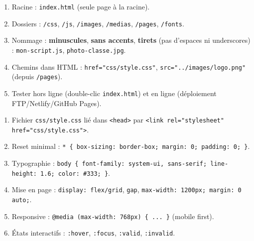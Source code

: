 \documentclass[11pt]{article}
\begin{document}
\begin{bilan}
\begin{methode}
\begin{enumerate}
    \item Racine : \texttt{index.html} (seule page à la racine).
    \item Dossiers : \texttt{/css}, \texttt{/js}, \texttt{/images}, \texttt{/medias}, \texttt{/pages}, \texttt{/fonts}.
    \item Nommage : \textbf{minuscules}, \textbf{sans accents}, \textbf{tirets} (pas d'espaces ni underscores) : \texttt{mon-script.js}, \texttt{photo-classe.jpg}.
    \item Chemins dans HTML : \texttt{href="css/style.css"}, \texttt{src="../images/logo.png"} (depuis \texttt{/pages}).
    \item Tester hors ligne (double-clic \texttt{index.html}) et en ligne (déploiement FTP/Netlify/GitHub Pages).
\end{enumerate}
\end{methode}

\begin{methode}
\begin{enumerate}
    \item Fichier \texttt{css/style.css} lié dans \texttt{<head>} par \texttt{<link rel="stylesheet" href="css/style.css">}.
    \item Reset minimal : \texttt{* \{ box-sizing: border-box; margin: 0; padding: 0; \}}.
    \item Typographie : \texttt{body \{ font-family: system-ui, sans-serif; line-height: 1.6; color: \#333; \}}.
    \item Mise en page : \texttt{display: flex/grid}, \texttt{gap}, \texttt{max-width: 1200px; margin: 0 auto;}.
    \item Responsive : \texttt{@media (max-width: 768px) \{ ... \}} (mobile first).
    \item États interactifs : \texttt{:hover}, \texttt{:focus}, \texttt{:valid}, \texttt{:invalid}.
\end{enumerate}
\end{methode}

\end{bilan}
\end{document}
